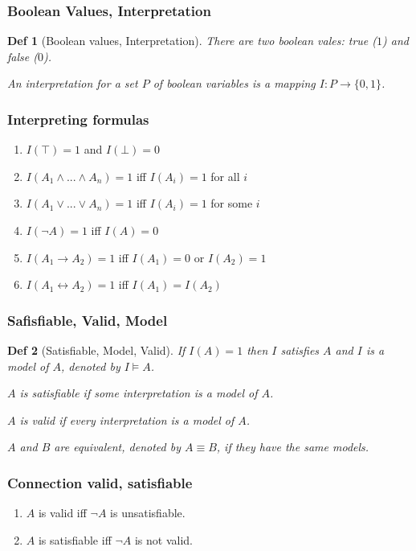 \documentclass[]{article}
\newtheorem*{definition*}{Def}
\begin{document}
\subsubsection{Boolean Values, Interpretation}
\begin{definition*}[Boolean values, Interpretation]
	There are two boolean vales: true ($1$) and false ($0$).
	
	An interpretation for a set $P$ of boolean variables is a mapping $I : P \rightarrow \{0,1\}$.
\end{definition*}

\subsubsection{Interpreting formulas}
\begin{enumerate}
	\item $I(\top) = 1$ and $I(\bot) = 0$
	\item $I(A_1 \land ... \land A_n) = 1$ iff $I(A_i) = 1$ for all $i$
	\item $I(A_1 \lor ... \lor A_n) = 1$ iff $I(A_i) = 1$ for some $i$
	\item $I(\lnot A) = 1$ iff $I(A) = 0$
	\item $I(A_1 \rightarrow A_2) = 1$ iff $I(A_1) = 0$ or $I(A_2) = 1$
	\item $I(A_1 \leftrightarrow A_2) = 1$ iff $I(A_1) = I(A_2)$
\end{enumerate}

\subsubsection{Safisfiable, Valid, Model}
\begin{definition*}[Satisfiable, Model, Valid]
	If $I(A) = 1$ then $I$ satisfies $A$ and $I$ is a model of $A$, denoted by $I \models A$.
	
	$A$ is satisfiable if some interpretation is a model of $A$.
	
	$A$ is valid if every interpretation is a model of $A$.
	
	$A$ and $B$ are equivalent, denoted by $A \equiv B$, if they have the same models.
\end{definition*}

\subsubsection{Connection valid, satisfiable}
\begin{enumerate}
	\item $A$ is valid iff $\lnot A$ is unsatisfiable.
	\item $A$ is satisfiable iff $\lnot A$ is not valid.
\end{enumerate}
\end{document}
